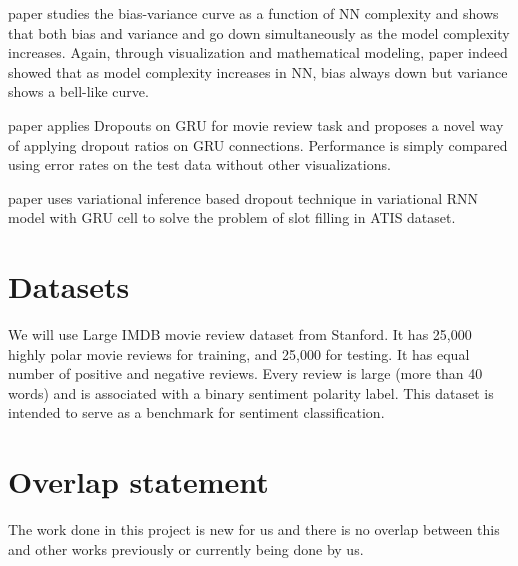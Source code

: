 \documentclass[11pt,a4paper]{article}
\begin{document}
\cite{neal2019modern} paper studies the bias-variance curve as a function of NN complexity and shows that both bias and variance and go down simultaneously as the model complexity increases. Again, through visualization and mathematical modeling, \cite{yang2020rethinking} paper indeed showed that as model complexity increases in NN, bias always down but variance shows a bell-like curve.

\cite{gal2016theoretically} paper applies Dropouts on GRU for movie review task and proposes a novel way of applying dropout ratios on GRU connections. Performance is simply compared using error rates on the test data without other visualizations. 

\cite{qi2020variational} paper uses variational inference based dropout technique in variational RNN model with GRU cell to solve the problem of slot filling in ATIS dataset.

\section{Datasets}
We will use \cite{maas-EtAl:2011:ACL-HLT2011} Large IMDB movie review dataset from Stanford. It has 25,000 highly polar movie reviews for training, and 25,000 for testing. It has equal number of positive and negative reviews. Every review is large (more than 40 words) and is associated with a binary sentiment polarity label. This dataset is intended to serve as a benchmark for sentiment classification.

\section{Overlap statement}
The work done in this project is new for us and there is no overlap between this and other works previously or currently being done by us.
\end{document}
